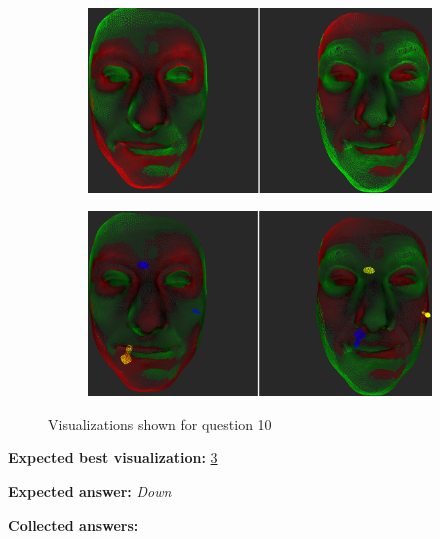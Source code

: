 \begin{figure}[h]
\begin{subfigure}{0.49\textwidth}
\includegraphics[width=\textwidth]{./img-study/pair20.PNG}
\caption{}
\label{fig:study-9-20}
\end{subfigure}
\begin{subfigure}{0.49\textwidth}
\includegraphics[width=\textwidth]{./img-study/pair24.PNG}
\caption{}
\label{fig:study-9-24}
\end{subfigure}
\caption{Visualizations shown for question 10}
\end{figure}
\medskip

{\bf Expected best visualization:} \ref{fig:study-9-24}
\medskip

{\bf Expected answer:} {\it Down}
\medskip

{\bf Collected answers:}

